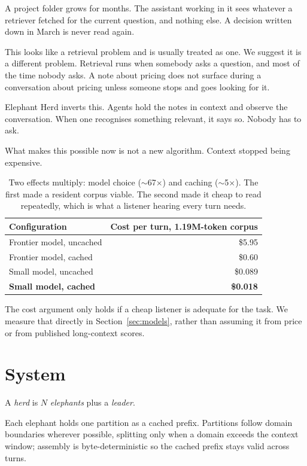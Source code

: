 \documentclass[11pt]{article}
\begin{document}
A project folder grows for months. The assistant working in it sees whatever a
retriever fetched for the current question, and nothing else. A decision written down
in March is never read again.

This looks like a retrieval problem and is usually treated as one. We suggest it is a
different problem. Retrieval runs when somebody asks a question, and most of the time
nobody asks. A note about pricing does not surface during a conversation about pricing
unless someone stops and goes looking for it.

Elephant Herd inverts this. Agents hold the notes in context and observe the
conversation. When one recognises something relevant, it says so. Nobody has to ask.

What makes this possible now is not a new algorithm. Context stopped being expensive.

\begin{table}[h]
\centering
\begin{tabular}{lr}
\toprule
Configuration & Cost per turn, 1.19M-token corpus \\
\midrule
Frontier model, uncached & \$5.95 \\
Frontier model, cached & \$0.60 \\
Small model, uncached & \$0.089 \\
\textbf{Small model, cached} & \textbf{\$0.018} \\
\bottomrule
\end{tabular}
\caption{Two effects multiply: model choice ($\sim$67$\times$) and caching
($\sim$5$\times$). The first made a resident corpus viable. The second made it cheap to
read repeatedly, which is what a listener hearing every turn needs.}
\end{table}

The cost argument only holds if a cheap listener is adequate for the task. We measure
that directly in Section~\ref{sec:models}, rather than assuming it from price or from
published long-context scores.

\section{System}

A \emph{herd} is $N$ \emph{elephants} plus a \emph{leader}.

Each elephant holds one partition as a cached prefix. Partitions follow domain
boundaries wherever possible, splitting only when a domain exceeds the context window;
assembly is byte-deterministic so the cached prefix stays valid across turns.
\end{document}
